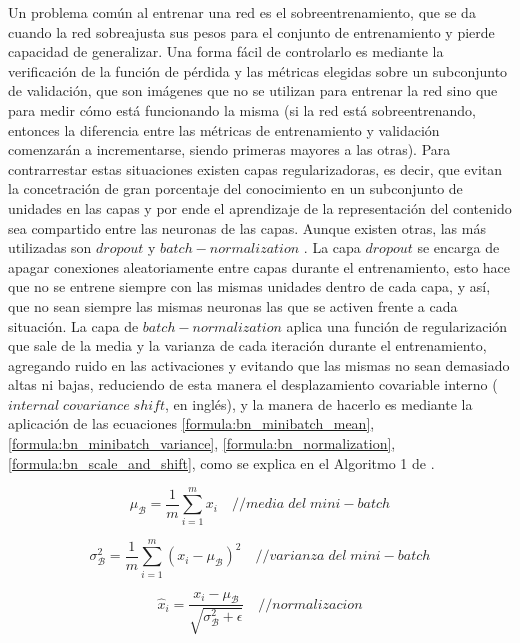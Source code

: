  Un problema común al entrenar una red es el sobreentrenamiento, que se da cuando la red sobreajusta sus pesos para el conjunto de entrenamiento y pierde capacidad de generalizar. Una forma fácil de controlarlo es mediante la verificación de la función de pérdida y las métricas elegidas sobre un subconjunto de validación, que son imágenes que no se utilizan para entrenar la red sino que para medir cómo está funcionando la misma (si la red está sobreentrenando, entonces la diferencia entre las métricas de entrenamiento y validación comenzarán a incrementarse, siendo primeras mayores a las otras). Para contrarrestar estas situaciones existen capas regularizadoras, es decir, que evitan la concetración de gran porcentaje del conocimiento en un subconjunto de unidades en las capas y por ende el aprendizaje de la representación del contenido sea compartido entre las neuronas de las capas. Aunque existen otras, las más utilizadas son \(dropout\) \cite{baldi2013understanding} y \(batch-normalization\) \cite{BatchNorm}. La capa \(dropout\) se encarga de apagar conexiones aleatoriamente entre capas durante el entrenamiento, esto hace que no se entrene siempre con las mismas unidades dentro de cada capa, y así, que no sean siempre las mismas neuronas las que se activen frente a cada situación. La capa de \(batch-normalization\) aplica una función de regularización que sale de la media y la varianza de cada iteración durante el entrenamiento, agregando ruido en las activaciones y evitando que las mismas no sean demasiado altas ni bajas, reduciendo de esta manera el desplazamiento covariable interno (\(internal\;covariance\; shift\), en inglés), y la manera de hacerlo es mediante la aplicación de las ecuaciones \ref{formula:bn_minibatch_mean}, \ref{formula:bn_minibatch_variance}, \ref{formula:bn_normalization}, \ref{formula:bn_scale_and_shift}, como se explica en el Algoritmo 1 de \cite{BatchNorm}.
 
 
 \begin{equation}\label{formula:bn_minibatch_mean}
 \mu_{\mathcal{B}} = \frac{1}{m} \sum_{i=1}^{m} x_{i}
\quad { // media\; del \; mini-batch}
 \end{equation}
 
 \begin{equation}\label{formula:bn_minibatch_variance}
 \sigma_{\mathcal{B}}^{2} = \frac{1}{m} \sum_{i=1}^{m}\left(x_{i}-\mu_{\mathcal{B}}\right)^{2}
\quad { // varianza \; del \; mini-batch}
 \end{equation}
 
 \begin{equation}\label{formula:bn_normalization}
 \widehat{x}_{i} = \frac{x_{i}-\mu_{\mathcal{B}}}{\sqrt{\sigma_{\mathcal{B}}^{2}+\epsilon}}
\quad { // normalizacion}
 \end{equation}
 
